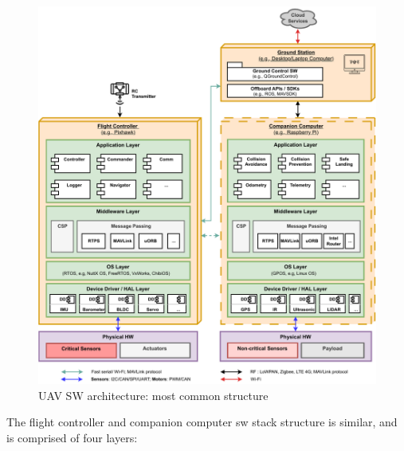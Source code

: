 \begin{figure}[!hbt]
  \centering
  \includegraphics[width=1.0\textwidth]{./img/pdf/uav-sw-arch.pdf} 
%   
  \caption{UAV SW architecture: most common structure}%
  \label{fig:uav-sw-arch}
\end{figure}

The flight controller and companion computer \gls{sw} stack structure is
similar, and is comprised of four layers:

